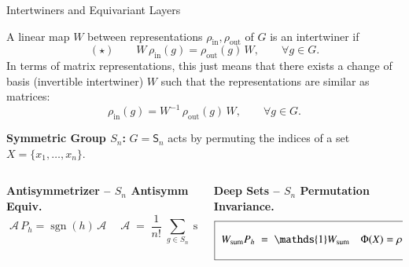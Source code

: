 \documentclass[aspectratio=64,8pt]{beamer}
\begin{document}
\begin{frame}{Intertwiners and Equivariant Layers}
  \vspace{-25pt}
  \begin{tcolorbox}[title=\textbf{Intertwiner (Weiler \& Cohen 2019)},colback=blue!5!white]

  A linear map $W$ between representations $\rho_{\text{in}},\rho_{\text{out}}$ of $G$ is an \alert{intertwiner} if
  \[
    (\star) \qquad W\,\rho_{\text{in}}(g)=\rho_{\text{out}}(g)\,W,
      \qquad\forall g\in G .
  \]
  In terms of matrix representations, this just means that there exists \alert{a change of basis} (invertible intertwiner) $W$ such that the representations are similar as matrices:
  \[
    \rho_{\text{in}}(g)=W^{-1}\,\rho_{\text{out}}(g)\,W,
    \qquad\forall g\in G .
  \]
  \end{tcolorbox}

  \vspace{0.5em}
  \begin{center}
    \textbf{Symmetric Group $S_n$: }$G=\mathsf S_n$ acts by permuting the indices of a set $X=\{x_1,\dots,x_n\}$.      \
  \end{center}

  \begin{columns}
    \begin{column}{0.5\textwidth}
      \textbf{Antisymmetrizer -- $S_n$ Antisymm Equiv.}\\
      \vspace{-10pt}
      $$
      \boxed{\;
      \mathcal{A}\,P_h=\operatorname{sgn}(h)\, \mathcal{A}
      \; \quad  \mathcal{A} \;=\; \frac{1}{n!}\;\sum_{g\in S_n}\!\operatorname{sgn}(g)\,P_g
     }
      $$
    \end{column}
    \begin{column}{0.5\textwidth}
      \textbf{Deep Sets -- $S_n$ Permutation Invariance.}\\
      \vspace{-10pt}
    \[
      \boxed{\;
      W_{\text{sum}}P_h\;=\;\mathds{1}W_{\text{sum}} \quad  \Phi(X)= \rho\Bigl(\sum_{i=1}^{n} h(x_i)\Bigr),
      }
      \]
    \end{column}
  \end{columns}


\end{frame}
\end{document}
